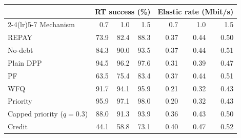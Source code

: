 \begin{tabular}{lrrrrrr}
\toprule
 & \multicolumn{3}{c}{RT success (\%)} & \multicolumn{3}{c}{Elastic rate (Mbit/s)} \\
\cmidrule(lr){2-4}\cmidrule(lr){5-7}
Mechanism & 0.7 & 1.0 & 1.5 & 0.7 & 1.0 & 1.5 \\
\midrule
REPAY & 73.9 & 82.4 & 88.3 & 0.37 & 0.44 & 0.50 \\
No-debt & 84.3 & 90.0 & 93.5 & 0.37 & 0.44 & 0.51 \\
Plain DPP & 94.5 & 96.2 & 97.6 & 0.31 & 0.39 & 0.47 \\
PF & 63.5 & 75.4 & 83.4 & 0.37 & 0.44 & 0.51 \\
WFQ & 91.7 & 94.1 & 95.9 & 0.21 & 0.32 & 0.43 \\
Priority & 95.9 & 97.1 & 98.0 & 0.20 & 0.32 & 0.43 \\
Capped priority ($q=0.3$) & 88.0 & 91.3 & 93.9 & 0.36 & 0.43 & 0.50 \\
Credit & 44.1 & 58.8 & 73.1 & 0.40 & 0.47 & 0.52 \\
\bottomrule
\end{tabular}
